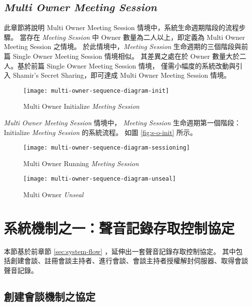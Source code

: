 \subsection{{\it Multi Owner Meeting Session}}

此章節將說明 Multi Owner Meeting Session 情境中，系統生命週期階段的流程步驟。
當存在 {\it Meeting Session} 中 Owner 數量為二人以上，即定義為 Multi Owner Meeting Session 之情境。
於此情境中，{\it Meeting Session} 生命週期的三個階段與前篇 Single Owner Meeting Session 情境相似。
其差異之處在於 Owner 數量大於二人。基於前篇 Single Owner Meeting Session 情境，
僅需小幅度的系統改動與引入 Shamir's Secret Sharing，即可達成 Multi Owner Meeting Session 情境。

\begin{figure}[H]
    \centering
    \texttt{[image: multi-owner-sequence-diagram-init]}
    \caption{Multi Owner Initialize {\it Meeting Session}}
    \label{fig:m-o-init}
\end{figure}

    {\it Multi Owner Meeting Session} 情境中，
{\it Meeting Session} 生命週期第一個階段：Initialize {\it Meeting Session} 的系統流程。
如圖 \ref{fig:s-o-init} 所示。

\begin{figure}[H]
    \centering
    \texttt{[image: multi-owner-sequence-diagram-sessioning]}
    \caption{Multi Owner Running {\it Meeting Session}}
    \label{fig:m-o-sessioning}
\end{figure}

\begin{figure}[H]
    \centering
    \texttt{[image: multi-owner-sequence-diagram-unseal]}
    \caption{Multi Owner {\it Unseal}}
    \label{fig:m-o-unseal}
\end{figure}


\section{系統機制之一：聲音記錄存取控制協定}
\label{sec:protocol}

    本節基於前章節 \ref{sec:system-flow} ，延伸出一套聲音記錄存取控制協定。
其中包括創建會談、註冊會談主持者、進行會談、會談主持者授權解封伺服器、取得會談聲音記錄。


\subsection{創建會談機制之協定}

